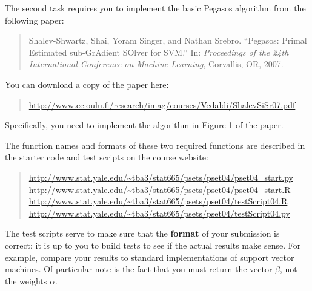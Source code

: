\documentclass[12pt]{article}
\begin{document}
The second task requires you to implement the basic Pegasos algorithm
from the following paper:
\begin{quote}
Shalev-Shwartz, Shai, Yoram Singer, and Nathan Srebro. ``Pegasos: Primal Estimated
sub-GrAdient SOlver for SVM.'' In: \textit{Proceedings of the 24th International
Conference on Machine Learning}, Corvallis, OR, 2007.
\end{quote}
You can download a copy of the paper here:
\begin{quote}
\url{http://www.ee.oulu.fi/research/imag/courses/Vedaldi/ShalevSiSr07.pdf}
\end{quote}
Specifically, you need to implement the algorithm in Figure 1 of the paper.

The function names and formats of these two required functions are
described in the starter code and test scripts on the course website:
\begin{quote}
\url{http://www.stat.yale.edu/~tba3/stat665/psets/pset04/pset04_start.py} \\
\url{http://www.stat.yale.edu/~tba3/stat665/psets/pset04/pset04_start.R} \\
\url{http://www.stat.yale.edu/~tba3/stat665/psets/pset04/testScript04.R} \\
\url{http://www.stat.yale.edu/~tba3/stat665/psets/pset04/testScript04.py}
\end{quote}
The test scripts serve to make sure that the \textbf{format} of your submission
is correct; it is up to you to build tests to see if the actual results make
sense. For example, compare your results to standard implementations of support
vector machines. Of particular note is the fact that you must return the vector
$\beta$, not the weights $\alpha$.
\end{document}
